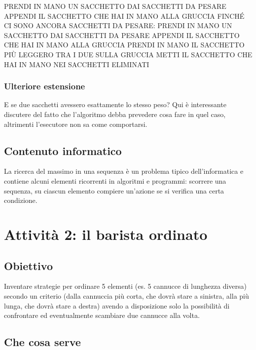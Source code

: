 {\small
\begin{pseudocodice}
PRENDI IN MANO UN SACCHETTO DAI SACCHETTI DA PESARE
APPENDI IL SACCHETTO CHE HAI IN MANO ALLA GRUCCIA
FINCHÉ CI SONO ANCORA SACCHETTI DA PESARE:
    PRENDI IN MANO UN SACCHETTO DAI SACCHETTI DA PESARE
    APPENDI IL SACCHETTO CHE HAI IN MANO ALLA GRUCCIA
    PRENDI IN MANO IL SACCHETTO PIÙ LEGGERO TRA I DUE SULLA GRUCCIA
    METTI IL SACCHETTO CHE HAI IN MANO NEI SACCHETTI ELIMINATI
\end{pseudocodice}
}

\subsubsection{Ulteriore estensione}\label{ulteriore-estensione}

E se due sacchetti avessero esattamente lo stesso peso? Qui è interessante discutere del fatto che l'algoritmo debba prevedere cosa fare in quel caso, altrimenti l'esecutore non sa come comportarsi.

\subsection{Contenuto informatico }\label{contenuto-informatico-9}

La ricerca del massimo in una sequenza è un problema tipico dell'informatica e contiene alcuni elementi ricorrenti in algoritmi e programmi: scorrere una sequenza, su ciascun elemento compiere un'azione se si verifica una certa condizione.

\section{Attività 2: il barista ordinato}

\ruoliattivita{\ruoloProgrammatore}

\subsection{Obiettivo }\label{obiettivo-6}

Inventare strategie per ordinare 5 elementi (es. 5 cannucce di lunghezza diversa) secondo un criterio (dalla cannuccia più corta, che dovrà stare a sinistra, alla più lunga, che dovrà stare a destra) avendo a disposizione solo la possibilità di confrontare ed eventualmente scambiare due cannucce alla volta.

\subsection{Che cosa serve }\label{che-cosa-serve}

